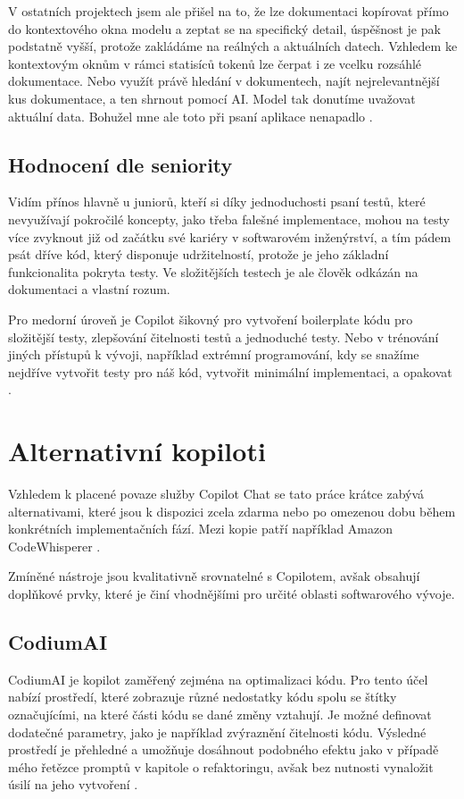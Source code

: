 \documentclass[FM,DP]{tulthesis}
\begin{document}
		V ostatních projektech jsem ale přišel na to, že lze dokumentaci kopírovat přímo do kontextového okna modelu a zeptat se na specifický detail, úspěšnost je pak podstatně vyšší, protože zakládáme na reálných a aktuálních datech. Vzhledem ke kontextovým oknům v rámci statisíců tokenů lze čerpat i ze vcelku rozsáhlé dokumentace. Nebo využít právě hledání v dokumentech, najít nejrelevantnější kus dokumentace, a ten shrnout pomocí AI. Model tak donutíme uvažovat aktuální data. Bohužel mne ale toto při psaní aplikace nenapadlo \cite{PEG}.
		
		\subsection{Hodnocení dle seniority}
		Vidím přínos hlavně u juniorů, kteří si díky jednoduchosti psaní testů, které nevyužívají pokročilé koncepty, jako třeba falešné implementace, mohou na testy více zvyknout již od začátku své kariéry v softwarovém inženýrství, a tím pádem psát dříve kód, který disponuje udržitelností, protože je jeho základní funkcionalita pokryta testy. Ve složitějších testech je ale člověk odkázán na dokumentaci a vlastní rozum.
		
		Pro medorní úroveň je Copilot šikovný pro vytvoření boilerplate kódu pro složitější testy, zlepšování čitelnosti testů a jednoduché testy. Nebo v trénování jiných přístupů k vývoji, například extrémní programování, kdy se snažíme nejdříve vytvořit testy pro náš kód, vytvořit minimální implementaci, a opakovat \cite{TDD}.
		
		\section{Alternativní kopiloti}
		Vzhledem k placené povaze služby Copilot Chat se tato práce krátce zabývá alternativami, které jsou k dispozici zcela zdarma nebo po omezenou dobu během konkrétních implementačních fází. Mezi kopie patří například Amazon CodeWhisperer \cite{codewhisperer}. 
		
		Zmíněné nástroje jsou kvalitativně srovnatelné s Copilotem, avšak obsahují doplňkové prvky, které je činí vhodnějšími pro určité oblasti softwarového vývoje.
		
		\subsection{CodiumAI}
		CodiumAI je kopilot zaměřený zejména na optimalizaci kódu. Pro tento účel nabízí prostředí, které zobrazuje různé nedostatky kódu spolu se štítky označujícími, na které části kódu se dané změny vztahují. Je možné definovat dodatečné parametry, jako je například zvýraznění čitelnosti kódu. Výsledné prostředí je přehledné a umožňuje dosáhnout podobného efektu jako v případě mého řetězce promptů v kapitole o refaktoringu, avšak bez nutnosti vynaložit úsilí na jeho vytvoření \cite{codium}.
		
\end{document}
